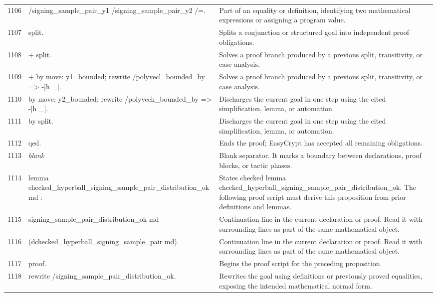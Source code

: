 \documentclass[10pt]{article}
\begin{document}
\begin{longtable}{r L{0.53\textwidth} L{0.37\textwidth}}
1106 & {\ttfamily\scriptsize         /signing\_sample\_pair\_y1 /signing\_sample\_pair\_y2 /=.} & Part of an equality or definition, identifying two mathematical expressions or assigning a program value. \\
1107 & {\ttfamily\scriptsize split.} & Splits a conjunction or structured goal into independent proof obligations. \\
1108 & {\ttfamily\scriptsize + split.} & Solves a proof branch produced by a previous split, transitivity, or case analysis. \\
1109 & {\ttfamily\scriptsize   + by move: y1\_bounded; rewrite /polyvecl\_bounded\_by => -[h \_].} & Solves a proof branch produced by a previous split, transitivity, or case analysis. \\
1110 & {\ttfamily\scriptsize   by move: y2\_bounded; rewrite /polyveck\_bounded\_by => -[h \_].} & Discharges the current goal in one step using the cited simplification, lemma, or automation. \\
1111 & {\ttfamily\scriptsize by split.} & Discharges the current goal in one step using the cited simplification, lemma, or automation. \\
1112 & {\ttfamily\scriptsize qed.} & Ends the proof; EasyCrypt has accepted all remaining obligations. \\
1113 & {\ttfamily\scriptsize \emph{blank}} & Blank separator.  It marks a boundary between declarations, proof blocks, or tactic phases. \\
1114 & {\ttfamily\scriptsize lemma checked\_hyperball\_signing\_sample\_pair\_distribution\_ok md :} & States checked lemma checked\_hyperball\_signing\_sample\_pair\_distribution\_ok.  The following proof script must derive this proposition from prior definitions and lemmas. \\
1115 & {\ttfamily\scriptsize   signing\_sample\_pair\_distribution\_ok md} & Continuation line in the current declaration or proof.  Read it with surrounding lines as part of the same mathematical object. \\
1116 & {\ttfamily\scriptsize     (dchecked\_hyperball\_signing\_sample\_pair md).} & Continuation line in the current declaration or proof.  Read it with surrounding lines as part of the same mathematical object. \\
1117 & {\ttfamily\scriptsize proof.} & Begins the proof script for the preceding proposition. \\
1118 & {\ttfamily\scriptsize rewrite /signing\_sample\_pair\_distribution\_ok.} & Rewrites the goal using definitions or previously proved equalities, exposing the intended mathematical normal form. \\

\end{longtable}
\end{document}
